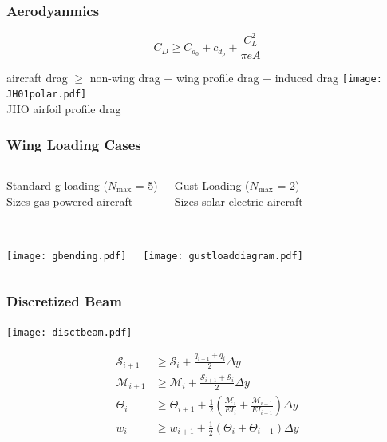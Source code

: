 \documentclass{beamer}
\begin{document}
\begin{frame}
    \frametitle{Aerodyanmics}

    \[ C_D \geq C_{d_0} + c_{d_p} + \frac{C_L^2}{\pi e A} \]

    \begin{center}
    aircraft drag $\geq$ non-wing drag + wing profile drag + induced drag
    \texttt{[image: JH01polar.pdf]} \\
    \scriptsize
    JHO airfoil profile drag
    \end{center}
    
\end{frame}

\begin{frame}
    \frametitle{Wing Loading Cases}
      
    \begin{columns}
        \begin{center}
        Standard g-loading ($N_{\text{max}}$ = 5) \\
        Sizes gas powered aircraft \\~\\
        \end{center}
        
        \begin{center}
        Gust Loading ($N_{\text{max}}$ = 2) \\
        Sizes solar-electric aircraft \\~\\
        \end{center}
    \end{columns}

    \begin{columns}
        \texttt{[image: gbending.pdf]}
        
        \texttt{[image: gustloaddiagram.pdf]}
    \end{columns}
\end{frame}

\begin{frame}
    \frametitle{Discretized Beam}

    \begin{center}
        \texttt{[image: disctbeam.pdf]}
    \end{center}

    \begin{align*}
        \mathcal{S}_{i+1} &\geq \mathcal{S}_i + \frac{q_{i+1} + q_i}{2} \Delta y \\
        \mathcal{M}_{i+1} &\geq \mathcal{M}_i + \frac{\mathcal{S}_{i+1} + \mathcal{S}_i}{2} \Delta y \\
        \Theta_{i} &\geq \Theta_{i+1} + \frac{1}{2} \left(\frac{\mathcal{M}_i}{EI_i} + \frac{\mathcal{M}_{i-1}}{EI_{i-1}} \right) \Delta y \\
        w_{i} &\geq w_{i+1} + \frac{1}{2} (\Theta_i + \Theta_{i-1}) \Delta y 
    \end{align*}
\end{frame}
\end{document}
